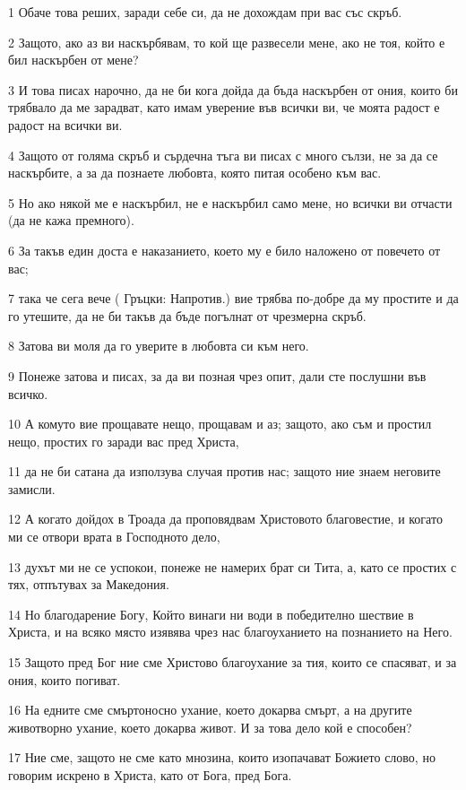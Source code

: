 \par 1 Обаче това реших, заради себе си, да не дохождам при вас със скръб.
\par 2 Защото, ако аз ви наскърбявам, то кой ще развесели мене, ако не тоя, който е бил наскърбен от мене?
\par 3 И това писах нарочно, да не би кога дойда да бъда наскърбен от ония, които би трябвало да ме зарадват, като имам уверение във всички ви, че моята радост е радост на всички ви.
\par 4 Защото от голяма скръб и сърдечна тъга ви писах с много сълзи, не за да се наскърбите, а за да познаете любовта, която питая особено към вас.
\par 5 Но ако някой ме е наскърбил, не е наскърбил само мене, но всички ви отчасти (да не кажа премного).
\par 6 За такъв един доста е наказанието, което му е било наложено от повечето от вас;
\par 7 така че сега вече ( Гръцки: Напротив.) вие трябва по-добре да му простите и да го утешите, да не би такъв да бъде погълнат от чрезмерна скръб.
\par 8 Затова ви моля да го уверите в любовта си към него.
\par 9 Понеже затова и писах, за да ви позная чрез опит, дали сте послушни във всичко.
\par 10 А комуто вие прощавате нещо, прощавам и аз; защото, ако съм и простил нещо, простих го заради вас пред Христа,
\par 11 да не би сатана да използува случая против нас; защото ние знаем неговите замисли.
\par 12 А когато дойдох в Троада да проповядвам Христовото благовестие, и когато ми се отвори врата в Господното дело,
\par 13 духът ми не се успокои, понеже не намерих брат си Тита, а, като се простих с тях, отпътувах за Македония.
\par 14 Но благодарение Богу, Който винаги ни води в победително шествие в Христа, и на всяко място изявява чрез нас благоуханието на познанието на Него.
\par 15 Защото пред Бог ние сме Христово благоухание за тия, които се спасяват, и за ония, които погиват.
\par 16 На едните сме смъртоносно ухание, което докарва смърт, а на другите животворно ухание, което докарва живот. И за това дело кой е способен?
\par 17 Ние сме, защото не сме като мнозина, които изопачават Божието слово, но говорим искрено в Христа, като от Бога, пред Бога.

